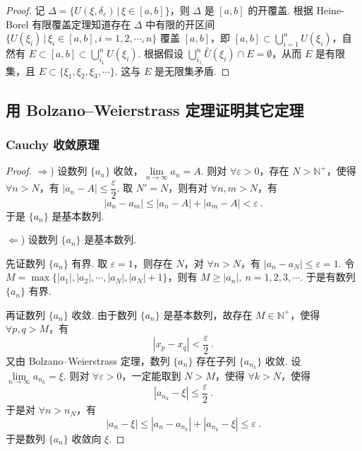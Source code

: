 \documentclass[zihao=-4,linespread=1.8,UTF8,nothm]{aytony_base}
\theoremstyle{definition}
\begin{document}
\begin{appendices}
\begin{proof}
        记 $\Delta = \{U(\xi, \delta_\varepsilon)\,|\,\xi \in [a, b]\}$，则 $\Delta$ 是 $[a, b]$ 的开覆盖. 根据 Heine-Borel 有限覆盖定理知道存在 $\Delta$ 中有限的开区间 $\{U(\xi_i)\,|\, \xi_i \in [a, b], i = 1, 2, \cdots, n\}$ 覆盖 $[a, b]$，即 $[a, b] \subset \bigcup\limits_{i=1}^nU(\xi_i)$，自然有 $E \subset [a,b] \subset \bigcup\limits_{i_1}^nU(\xi_i)$. 根据假设 $\bigcup\limits_{i_1}^n\overset{\circ}{U}(\xi_i) \cap E = \emptyset$，从而 $E$ 是有限集，且 $E \subset \{\xi_1, \xi_2, \xi_3, \cdots\}$. 这与 $E$ 是无限集矛盾.
    \end{proof}


    \subsection{用 Bolzano--Weierstrass 定理证明其它定理}

    \subsubsection{Cauchy 收敛原理}

    \begin{proof}
        $\Rightarrow$) 设数列 $\{a_n\}$ 收敛，$\lim\limits_{n \to \infty} a_n = A$. 则对 $\forall \varepsilon > 0$，存在 $N > \mathbb{N}^+$，使得 $\forall n > N$，有 $|a_n - A| \leqslant \dfrac{\varepsilon}{2}$. 取 $N' = N$，则有对 $\forall n, m > N$，有 $$
            |a_n - a_m| \leqslant |a_n - A| + |a_m - A| < \varepsilon\ .
        $$ 于是 $\{a_n\}$ 是基本数列.

        $\Leftarrow$) 设数列 $\{a_n\}$ 是基本数列.

        先证数列 $\{a_n\}$ 有界. 取 $\varepsilon = 1$，则存在 $N$，对 $\forall n > N$，有 $|a_n - a_N| \leqslant \varepsilon = 1$. 令 $M = \max \{|a_1|, |a_2|, \cdots, |a_N|, |a_N| + 1\}$，则有 $M \geqslant |a_n|,\ n = 1, 2, 3, \cdots$. 于是有数列 $\{a_n\}$ 有界.

        再证数列 $\{a_n\}$ 收敛. 由于数列 $\{a_n\}$ 是基本数列，故存在 $M \in \mathbb{N}^+$，使得 $\forall p, q > M$，有 $$
            |x_p - x_q| < \dfrac{\varepsilon}{2}\ .
        $$ 又由 Bolzano--Weierstrass 定理，数列 $\{a_n\}$ 存在子列 $\{a_{n_k}\}$ 收敛. 设 $\lim\limits_{n \to \infty} a_{n_k} = \xi$. 则对 $\forall \varepsilon > 0$，一定能取到 $N > M$，使得 $\forall k > N$，使得 $$
            |a_{n_k} - \xi| \leqslant \dfrac{\varepsilon}{2}\ .
        $$ 于是对 $\forall n > n_N$，有 $$
            |a_n - \xi| \leqslant |a_n - a_{n_k}| + |a_{n_k} - \xi| \leqslant \varepsilon\ .
        $$ 于是数列 $\{a_n\}$ 收敛向 $\xi$.
    \end{proof}


\end{appendices}
\end{document}
